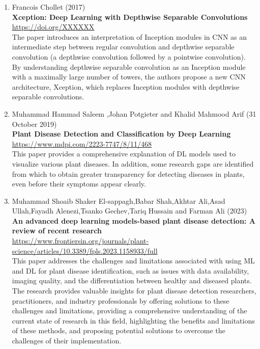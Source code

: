 \begin{enumerate}
    \item Francois Chollet (2017) \\
        \textbf{Xception: Deep Learning with Depthwise Separable Convolutions} \\
        \href{https://doi.org/XXXXXX}{https://doi.org/XXXXXX} \\
        The paper introduces an interpretation of Inception modules in CNN as an intermediate step between regular convolution and depthwise separable convolution (a depthwise convolution followed by a pointwise convolution). By understanding depthwise separable convolution as an Inception module with a maximally large number of towers, the authors propose a new CNN architecture, Xception, which replaces Inception modules with depthwise separable convolutions.  \\
    
    \item Muhammad Hammad Saleem ,Johan Potgieter and Khalid Mahmood Arif (31 October 2019) \\
        \textbf{Plant Disease Detection and Classification by Deep Learning} \\
        \href{https://www.mdpi.com/2223-7747/8/11/468}{https://www.mdpi.com/2223-7747/8/11/468} \\
        This paper provides a comprehensive explanation of DL models used to visualize various plant diseases. In addition, some research gaps are identified from which to obtain greater transparency for detecting diseases in plants, even before their symptoms appear clearly.\\

    \item Muhammad Shoaib Shaker El-sappagh,Babar Shah,Akhtar Ali,Asad Ullah,Fayadh Alenezi,Tsanko Gechev,Tariq Hussain and Farman Ali (2023) \\
        \textbf{An advanced deep learning models-based plant disease detection: A review of recent research } \\
        \href{https://www.frontiersin.org/journals/plant-science/articles/10.3389/fpls.2023.1158933/full}{https://www.frontiersin.org/journals/plant-science/articles/10.3389/fpls.2023.1158933/full} \\
        This paper addresses the challenges and limitations associated with using ML and DL for plant disease identification, such as issues with data availability, imaging quality, and the differentiation between healthy and diseased plants. The research provides valuable insights for plant disease detection researchers, practitioners, and industry professionals by offering solutions to these challenges and limitations, providing a comprehensive understanding of the current state of research in this field, highlighting the benefits and limitations of these methods, and proposing potential solutions to overcome the challenges of their implementation.\\


\end{enumerate}
